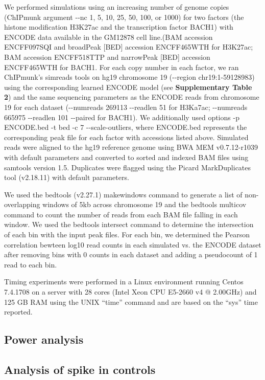\documentclass[12pt]{article}
\begin{document}
We performed simulations using an increasing number of genome copies (ChIPmunk argument -{}-nc 1, 5, 10, 25, 50, 100, or 1000) for two factors (the histone modification H3K27ac and the transcription factor BACH1) with ENCODE data available in the GM12878 cell line.(BAM accession ENCFF097SQI and broadPeak [BED] accession ENCFF465WTH for H3K27ac; BAM accession ENCFF518TTP and narrowPeak [BED] accession ENCFF465WTH for BACH1.
For each copy number in each factor, we ran ChIPmunk's simreads tools on hg19 chromosome 19 (-{}-region chr19:1-59128983) using the corresponding learned ENCODE model (see \textbf{Supplementary Table 2}) and the same sequencing parameters as the ENCODE reads from chromosome 19 for each dataset (-{}-numreads 269113 -{}-readlen 51 for H3Ka7ac; -{}-numreads 665975 -{}-readlen 101 -{}-paired for BACH1). 
We additionally used options -p ENCODE.bed -t bed -c 7 -{}-scale-outliers, where ENCODE.bed represents the corresponding peak file for each factor with accessions listed above.
Simulated reads were aligned to the hg19 reference genome using BWA MEM \cite{bwamem} v0.7.12-r1039 with default parameters and converted to sorted and indexed BAM files using samtools \cite{samtools} version 1.5. Duplicates were flagged using the Picard \cite{picard} MarkDuplicates tool (v2.18.11) with default parameters.

We used the bedtools \cite{bedtools} (v2.27.1) makewindows command to generate a list of non-overlapping windows of 5kb across chromosome 19 and the bedtools multicov command to count the number of reads from each BAM file falling in each window. We used the bedtools intersect command to determine the intersection of each bin with the input peak files. For each bin, we determined the Pearson correlation bewteen log10 read counts in each simulated vs. the ENCODE dataset after removing bins with 0 counts in each dataset and adding a pseudocount of 1 read to each bin.

Timing experiments were performed in a Linux environment running Centos 7.4.1708 on a server with 28 cores (Intel\textsuperscript{\textregistered} Xeon\textsuperscript{\textregistered} CPU E5-2660 v4 @ 2.00GHz) and 125 GB RAM using the UNIX ``time'' command and are based on the ``sys'' time reported. %


\subsection*{Power analysis}

\subsection*{Analysis of spike in controls}



\end{document}
